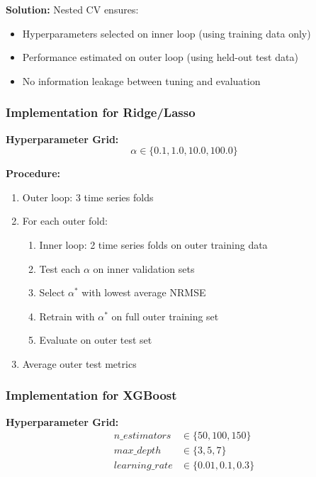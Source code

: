 \documentclass[12pt,a4paper]{article}
\begin{document}
\textbf{Solution:} Nested CV ensures:
\begin{itemize}
    \item Hyperparameters selected on inner loop (using training data only)
    \item Performance estimated on outer loop (using held-out test data)
    \item No information leakage between tuning and evaluation
\end{itemize}

\subsubsection{Implementation for Ridge/Lasso}

\textbf{Hyperparameter Grid:}
\begin{equation}
\alpha \in \{0.1, 1.0, 10.0, 100.0\}
\end{equation}

\textbf{Procedure:}
\begin{enumerate}
    \item Outer loop: 3 time series folds
    \item For each outer fold:
    \begin{enumerate}
        \item Inner loop: 2 time series folds on outer training data
        \item Test each $\alpha$ on inner validation sets
        \item Select $\alpha^*$ with lowest average NRMSE
        \item Retrain with $\alpha^*$ on full outer training set
        \item Evaluate on outer test set
    \end{enumerate}
    \item Average outer test metrics
\end{enumerate}

\subsubsection{Implementation for XGBoost}

\textbf{Hyperparameter Grid:}
\begin{align}
n\_estimators &\in \{50, 100, 150\} \\
max\_depth &\in \{3, 5, 7\} \\
learning\_rate &\in \{0.01, 0.1, 0.3\}
\end{align}
\end{document}
